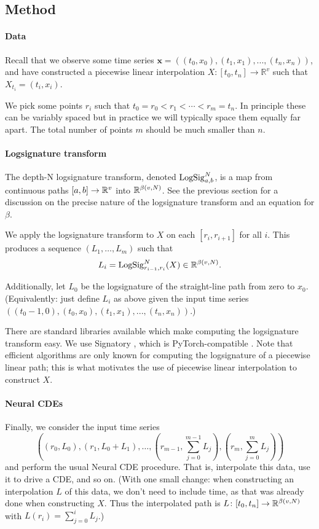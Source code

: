 \subsection{Method}
\paragraph{Data} Recall that we observe some time series $\mathbf{x} = ((t_0, x_0), (t_1, x_1), ..., (t_n, x_n))$, and have constructed a piecewise linear interpolation $X \colon [t_0, t_n] \to \mathbb{R}^{v}$ such that $X_{t_i} = (t_i, x_i)$.

We pick some points $r_i$ such that $t_0 = r_0 < r_1 < \cdots < r_m = t_n$. In principle these can be variably spaced but in practice we will typically space them equally far apart. The total number of points $m$ should be much smaller than $n$.

\paragraph{Logsignature transform} The depth-N logsignature transform, denoted $\mathrm{LogSig}^N_{a, b}$, is a map from continuous paths $[a, b] \to \mathbb{R}^v$ into $\mathbb{R}^{\beta(v, N)}$. See the previous section for a discussion on the precise nature of the logsignature transform and an equation for $\beta$.

We apply the logsignature transform to $X$ on each $[r_i, r_{i+1}]$ for all $i$. This produces a sequence $(L_1, \ldots, L_{m})$ such that
\begin{equation*}
    L_i = \mathrm{LogSig}^N_{r_{i-1}, r_{i}}(X) \in \mathbb{R}^{\beta(v, N)}.
\end{equation*}

Additionally, let $L_{0}$ be the logsignature of the straight-line path from zero to $x_0$. (Equivalently: just define $L_i$ as above given the input time series $((t_0 - 1, 0), (t_0, x_0), (t_1, x_1), ..., (t_n, x_n))$.)

There are standard libraries available which make computing the logsignature transform easy. We use Signatory \citep{signatory}, which is PyTorch-compatible \citep{pytorch}. Note that efficient algorithms are only known for computing the logsignature of a piecewise linear path; this is what motivates the use of piecewise linear interpolation to construct $X$.

\paragraph{Neural CDEs} Finally, we consider the input time series
\begin{equation}
    ((r_0, L_0), (r_1, L_0 + L_1), \ldots, (r_{m - 1}, \sum_{j = 0}^{m - 1} L_j), (r_m, \sum_{j = 0}^{m} L_j))
    \label{eq:logsig_time_series}
\end{equation}
and perform the usual Neural CDE procedure. That is, interpolate this data, use it to drive a CDE, and so on. (With one small change: when constructing an interpolation $L$ of this data, we don't need to include time, as that was already done when constructing $X$. Thus the interpolated path is $L \colon [t_0, t_n] \to \mathbb{R}^{\beta(v, N)}$ with $L(r_i) = \sum_{j = 0}^i L_j$.)

